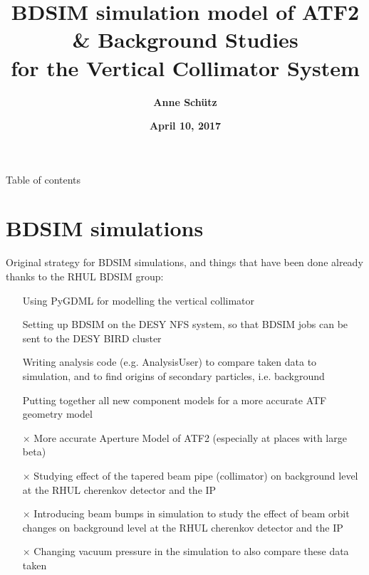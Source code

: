 \documentclass[xcolor={dvipsnames}]{beamer}
\title[ATF2 Background Simulations]{\textbf{BDSIM simulation model of ATF2 \& Background Studies\\for the Vertical Collimator System}}
\author{\textbf{Anne Sch\"utz}}
\institute{\textbf{KIT, DESY}}
\date{\textbf{April 10, 2017}}
\begin{document}
{
\begin{frame}
  \titlepage
\end{frame}
}

\begin{frame}{Table of contents}
  \tableofcontents
\end{frame}


\section{BDSIM simulations}
\begin{frame}
Original strategy for BDSIM simulations, and things that have been done already thanks to the RHUL BDSIM group:
\begin{itemize}
    \item[\checkmark] Using PyGDML for modelling the vertical collimator
    \item[\checkmark] Setting up BDSIM on the DESY NFS system, so that BDSIM jobs can be sent to the DESY BIRD cluster
    \item[\checkmark] Writing analysis code (e.g. AnalysisUser) to compare taken data to simulation, and to find origins of secondary particles, i.e. background
    \item[\checkmark] Putting together all new component models for a more accurate ATF geometry model
    \item[$\times$] More accurate Aperture Model of ATF2 (especially at places with large beta)
    \item[$\times$] Studying effect of the tapered beam pipe (collimator) on background level at the RHUL cherenkov detector and the IP
    \item[$\times$] Introducing beam bumps in simulation to study the effect of beam orbit changes  on background level at the RHUL cherenkov detector and the IP
    \item[$\times$] Changing vacuum pressure in the simulation to also compare these data taken
\end{itemize}

\end{frame}

\end{document}
